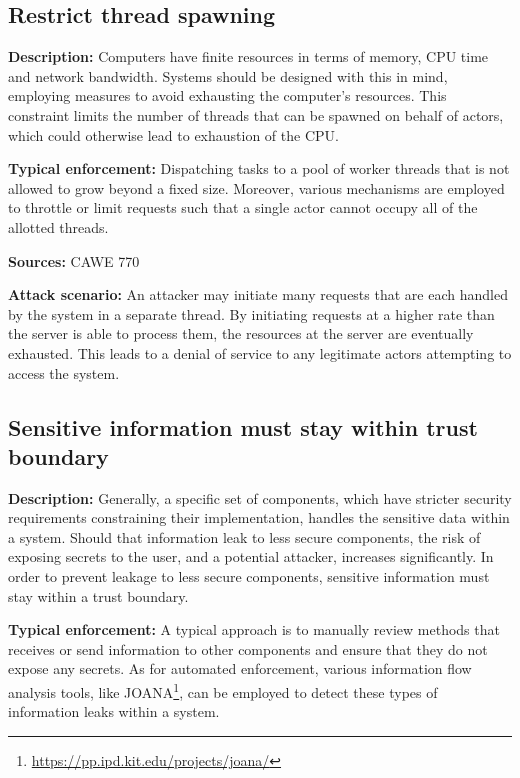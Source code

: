 \subsection{Restrict thread spawning}

\textbf{Description:} Computers have finite resources in terms of memory, CPU time and network bandwidth. Systems should be designed with this in mind, employing measures to avoid exhausting the computer's resources. This constraint limits the number of threads that can be spawned on behalf of actors, which could otherwise lead to exhaustion of the CPU.
 
 \textbf{Typical enforcement:} Dispatching tasks to a pool of worker threads that is not allowed to grow beyond a fixed size. Moreover, various mechanisms are employed to throttle or limit requests such that a single actor cannot occupy all of the allotted threads.
 
 \textbf{Sources:} CAWE 770
 
 \textbf{Attack scenario:} An attacker may initiate many requests that are each handled by the system in a separate thread. By initiating requests at a higher rate than the server is able to process them, the resources at the server are eventually exhausted. This leads to a denial of service to any legitimate actors attempting to access the system.

\subsection{Sensitive information must stay within trust boundary}\label{sec:trust_boundry_constraint}

\textbf{Description:} 
Generally, a specific set of components, which have stricter security requirements constraining their implementation, handles the sensitive data within a system. Should that information leak to less secure components, the risk of exposing secrets to the user, and a potential attacker, increases significantly. In order to prevent leakage to less secure components, sensitive information must stay within a trust boundary.
 
 \textbf{Typical enforcement:}
 A typical approach is to manually review methods that receives or send information to other components and ensure that they do not expose any secrets. As for automated enforcement, various information flow analysis tools, like JOANA\footnote{\url{https://pp.ipd.kit.edu/projects/joana/}}, can be employed to detect these types of information leaks within a system.
 
